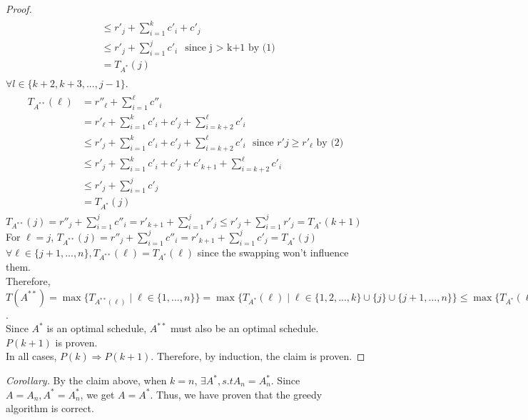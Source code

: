 \documentclass[11pt]{article}
\begin{document}
\begin{enumerate}
\begin{enumerate}
\begin{proof}
\begin{align*}
\begin{split}
                 & \le r'_{j} + \sum_{i=1}^{k} c'_i + c'_{j}\\
                 & \leq r'_{j} + \sum_{i=1}^{j} c'_i \ \  \text{since j $>$ k+1 by (1)}\\
                 &= T_{A^*}(j)
            \end{split}
        \end{align*}
        $\forall l\in\{k+2,k+3,...,j-1\}$.
        \begin{align*}
            \begin{split}
                 T_{A^{**}}(\ell) &= r''_{\ell} + \sum_{i=1}^{\ell} c''_i \\
                &= r'_{\ell} + \sum_{i=1}^{k}c'_i + c'_j + \sum_{i=k+2}^{\ell}c'_i \\
                &\leq r'_j + \sum_{i=1}^{k}c'_i + c'_j + \sum_{i=k+2}^{\ell}c'_i \ \ \ \text{since $r'j \geq r'_\ell$ by (2)}\\
                &\leq r'_j + \sum_{i=1}^{k}c'_i + c'_j + c'_{k+1} + \sum_{i=k+2}^{\ell}c'_i \\
                 &\leq r'_j + \sum_{i=1}^{j}c'_j\\
                 &= T_{A^*}(j)
            \end{split}
        \end{align*}
        $T_{A^{**}}(j) = r''_j + \sum_{i=1}^j c''_i = r'_{k+1} + \sum_{i=1}^j r'_j \leq r'_{j} + \sum_{i=1}^j r'_j = T_{A^*}(k+1)$\\[2ex]
         For $\ell = j$, $T_{A^{**}}(j) = r''_j + \sum_{i=1}^j c''_i = r'_{k+1} + \sum_{i=1}^j c'_j = T_{A^*}(j)$\\[2ex]
        $\forall \ell \in \{j+1,...,n\}, T_{A^{**}}(\ell) = T_{A^*}(\ell)$ since the swapping won't influence them. \\[2ex]
        Therefore, $T(A^{**}) = \max\{T_{A^{**}(\ell)}\mid \ell \in\{1,...,n\}\} = \max\{T_{A^{*}}(\ell)\mid \ell \in\{1,2,...,k\}\cup\{j\} \cup \{j+1,...,n\}\} \leq \max\{T_{A^{*}}(\ell)\mid \ell\in\{1,2,...,n\}\} = T(A^*)$. \\
        Since $A^*$ is an optimal schedule, $A^{**}$ must also be an optimal schedule. $P(k+1)$ is proven. \\
        In all cases, $P(k) \Rightarrow P(k+1)$. Therefore, by induction, the claim is proven.
        \end{proof}
        \textit{Corollary. }By the claim above, when $k = n$, $\exists A^*, s.t A_n = A^*_n$. Since $A = A_n, A^* = A^*_n$, we get $A = A^*$. Thus, we have proven that the greedy algorithm is correct.  

\end{enumerate}
\end{enumerate}
\end{document}
